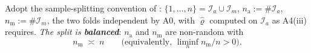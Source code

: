 \begin{definition}\label{def:hatT}
Adopt the sample-splitting convention of : $\{1,\dots,n\}=\mathcal I_a\cup\mathcal I_m$,
$n_{\mathrm a}:=\#\mathcal I_a$, $n_{\mathrm m}:=\#\mathcal I_m$, the two folds independent by
A0, with $\hat\varrho$ computed on $\mathcal I_a$ as A4(iii) requires.
\emph{The split is \textbf{balanced}}: $n_{\mathrm a}$ and $n_{\mathrm m}$ are non-random with
\begin{equation}\label{eq:foldbal}
n_{\mathrm m}\;\asymp\;n
\qquad\text{(equivalently, }\liminf_n n_{\mathrm m}/n>0\text{)} .
\end{equation}


\end{definition}
